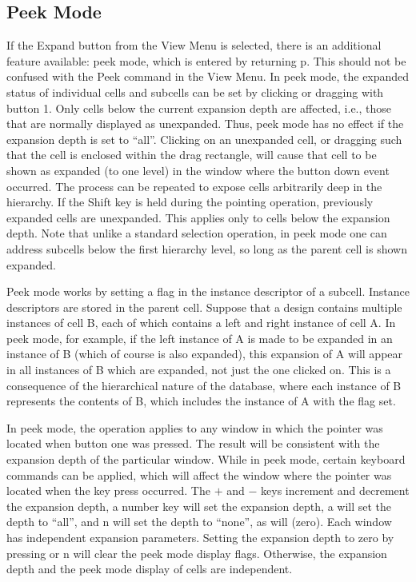 \subsection{Peek Mode}
If the {\cb Expand} button from the {\cb View Menu} is selected, there
is an additional feature available:  peek mode, which is entered by
returning {\et p}.  This should not be confused with the {\cb Peek}
command in the {\cb View Menu}.  In peek mode, the expanded status of
individual cells and subcells can be set by clicking or dragging with
button 1.  Only cells below the current expansion depth are affected,
i.e., those that are normally displayed as unexpanded.  Thus, peek
mode has no effect if the expansion depth is set to ``all''.  Clicking
on an unexpanded cell, or dragging such that the cell is enclosed
within the drag rectangle, will cause that cell to be shown as
expanded (to one level) in the window where the button down event
occurred.  The process can be repeated to expose cells arbitrarily
deep in the hierarchy.  If the {\kb Shift} key is held during the
pointing operation, previously expanded cells are unexpanded.  This
applies only to cells below the expansion depth.  Note that unlike a
standard selection operation, in peek mode one can address subcells
below the first hierarchy level, so long as the parent cell is shown
expanded.

Peek mode works by setting a flag in the instance descriptor of a
subcell.  Instance descriptors are stored in the parent cell.  Suppose
that a design contains multiple instances of cell B, each of which
contains a left and right instance of cell A.  In peek mode, for
example, if the left instance of A is made to be expanded in an
instance of B (which of course is also expanded), this expansion of A
will appear in all instances of B which are expanded, not just the one
clicked on.  This is a consequence of the hierarchical nature of the
database, where each instance of B represents the contents of B, which
includes the instance of A with the flag set.

In peek mode, the operation applies to any window in which the pointer
was located when button one was pressed.  The result will be
consistent with the expansion depth of the particular window.  While
in peek mode, certain keyboard commands can be applied, which will
affect the window where the pointer was located when the key press
occurred.  The {\kb $+$} and {\kb $-$} keys increment and decrement
the expansion depth, a number key will set the expansion depth, {\kb
a} will set the depth to ``all'', and {\kb n} will set the depth to
``none'', as will {} (zero).  Each window has independent
expansion parameters.  Setting the expansion depth to zero by pressing
{} or {\kb n} will clear the peek mode display flags.  Otherwise,
the expansion depth and the peek mode display of cells are
independent.

